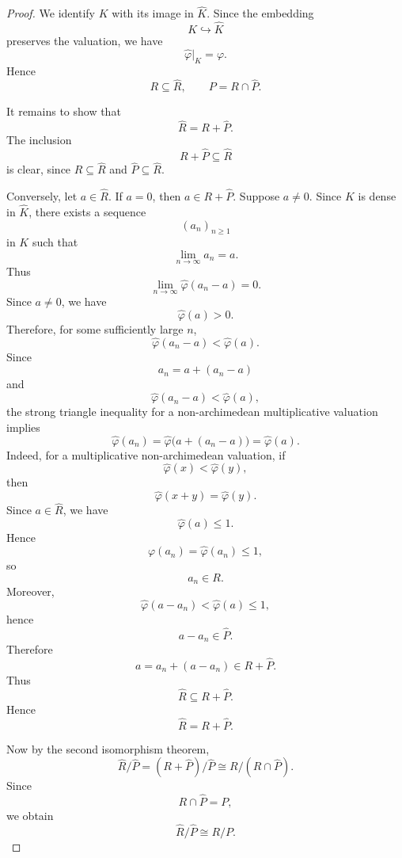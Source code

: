 \begin{proof}
    We identify \(K\) with its image in \(\widehat{K}\). Since the embedding
    \[
        K\hookrightarrow \widehat{K}
    \]
    preserves the valuation, we have
    \[
        \widehat{\varphi}|_K=\varphi.
    \]
    Hence
    \[
        R\subseteq \widehat{R},
        \qquad
        P=R\cap \widehat{P}.
    \]

    It remains to show that
    \[
        \widehat{R}=R+\widehat{P}.
    \]
    The inclusion
    \[
        R+\widehat{P}\subseteq \widehat{R}
    \]
    is clear, since \(R\subseteq \widehat{R}\) and \(\widehat{P}\subseteq \widehat{R}\).

    Conversely, let \(a\in \widehat{R}\). If \(a=0\), then \(a\in R+\widehat{P}\).
    Suppose \(a\neq 0\). Since \(K\) is dense in \(\widehat{K}\), there exists a sequence
    \[
        (a_n)_{n\geq 1}
    \]
    in \(K\) such that
    \[
        \lim_{n\to\infty} a_n=a.
    \]
    Thus
    \[
        \lim_{n\to\infty}\widehat{\varphi}(a_n-a)=0.
    \]
    Since \(a\neq 0\), we have
    \[
        \widehat{\varphi}(a)>0.
    \]
    Therefore, for some sufficiently large \(n\),
    \[
        \widehat{\varphi}(a_n-a)<\widehat{\varphi}(a).
    \]
    Since
    \[
        a_n=a+(a_n-a)
    \]
    and
    \[
        \widehat{\varphi}(a_n-a)<\widehat{\varphi}(a),
    \]
    the strong triangle inequality for a non-archimedean multiplicative valuation implies
    \[
        \widehat{\varphi}(a_n)
        =
        \widehat{\varphi}\bigl(a+(a_n-a)\bigr)
        =
        \widehat{\varphi}(a).
    \]
    Indeed, for a multiplicative non-archimedean valuation, if
    \[
        \widehat{\varphi}(x)<\widehat{\varphi}(y),
    \]
    then
    \[
        \widehat{\varphi}(x+y)=\widehat{\varphi}(y).
    \]
    Since \(a\in \widehat{R}\), we have
    \[
        \widehat{\varphi}(a)\leq 1.
    \]
    Hence
    \[
        \varphi(a_n)=\widehat{\varphi}(a_n)\leq 1,
    \]
    so
    \[
        a_n\in R.
    \]
    Moreover,
    \[
        \widehat{\varphi}(a-a_n)<\widehat{\varphi}(a)\leq 1,
    \]
    hence
    \[
        a-a_n\in \widehat{P}.
    \]
    Therefore
    \[
        a=a_n+(a-a_n)\in R+\widehat{P}.
    \]
    Thus
    \[
        \widehat{R}\subseteq R+\widehat{P}.
    \]
    Hence
    \[
        \widehat{R}=R+\widehat{P}.
    \]

    Now by the second isomorphism theorem,
    \[
        \widehat{R}/\widehat{P}
        =
        (R+\widehat{P})/\widehat{P}
        \cong
        R/(R\cap \widehat{P}).
    \]
    Since
    \[
        R\cap \widehat{P}=P,
    \]
    we obtain
    \[
        \widehat{R}/\widehat{P}\cong R/P.
    \]
\end{proof}

